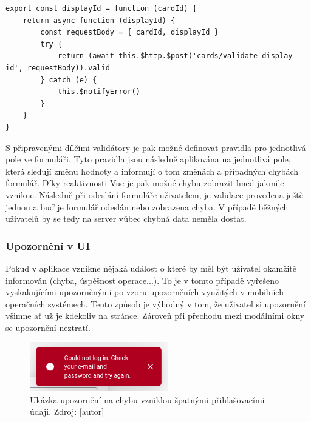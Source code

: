 		\begin{lstlisting}[caption={Ukázka implementace vlastního validátoru využívající API k validaci hodnoty. Zdroj: [autor]}]
export const displayId = function (cardId) {
	return async function (displayId) {
		const requestBody = { cardId, displayId }
		try {
	  		return (await this.$http.$post('cards/validate-display-id', requestBody)).valid
		} catch (e) {
		    this.$notifyError()
		}
	}
}
		\end{lstlisting}

		S připravenými dílčími validátory je pak možné definovat pravidla pro jednotlivá pole ve formuláři.
		Tyto pravidla jsou následně aplikována na jednotlivá pole, která sledují změnu hodnoty a informují o tom změnách
		a případných chybách formulář.
		Díky reaktivnosti Vue je pak možné chybu zobrazit hned jakmile vznikne.
		Následně při odeslání formuláře uživatelem, je validace provedena ještě jednou a buď je formulář odeslán nebo
		zobrazena chyba.
		V případě běžných uživatelů by se tedy na server vůbec chybná data neměla dostat.

		\subsubsection{Upozornění v UI}

		Pokud v aplikace vznikne nějaká událost o které by měl být uživatel okamžitě informován (chyba, úspěšnost operace...).
		To je v tomto případě vyřešeno vyskakujícími upozorněnými po vzoru upozorněních využitých v mobilních operačních
		systémech.
		Tento způsob je výhodný v tom, že uživatel si upozornění všimne ať už je kdekoliv na stránce.
		Zároveň při přechodu mezi modálními okny se upozornění neztratí.

		\begin{figure}[H]
			\centering
			\includegraphics[width=6cm]{obrazky/upozorneni_chyba}\hfill
			\caption{Ukázka upozornění na chybu vzniklou špatnými přihlašovacími údaji. Zdroj: [autor]}
		\end{figure}

